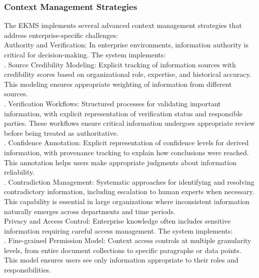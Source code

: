 \subsubsection{Context Management Strategies}
The EKMS implements several advanced context management strategies that address enterprise-specific challenges:\\ \newline
Authority and Verification: In enterprise environments, information authority is critical for decision-making. The system implements:\\ . Source Credibility Modeling: Explicit tracking of information sources with credibility scores based on organizational role, expertise, and historical accuracy. This modeling ensures appropriate weighting of information from different sources.\\ . Verification Workflows: Structured processes for validating important information, with explicit representation of verification status and responsible parties. These workflows ensure critical information undergoes appropriate review before being treated as authoritative.\\ . Confidence Annotation: Explicit representation of confidence levels for derived information, with provenance tracking to explain how conclusions were reached. This annotation helps users make appropriate judgments about information reliability.\\ . Contradiction Management: Systematic approaches for identifying and resolving contradictory information, including escalation to human experts when necessary. This capability is essential in large organizations where inconsistent information naturally emerges across departments and time periods.\\ \newline
Privacy and Access Control: Enterprise knowledge often includes sensitive information requiring careful access management. The system implements:\\ . Fine-grained Permission Model: Context access controls at multiple granularity levels, from entire document collections to specific paragraphs or data points. This model ensures users see only information appropriate to their roles and responsibilities.\\ \newline

